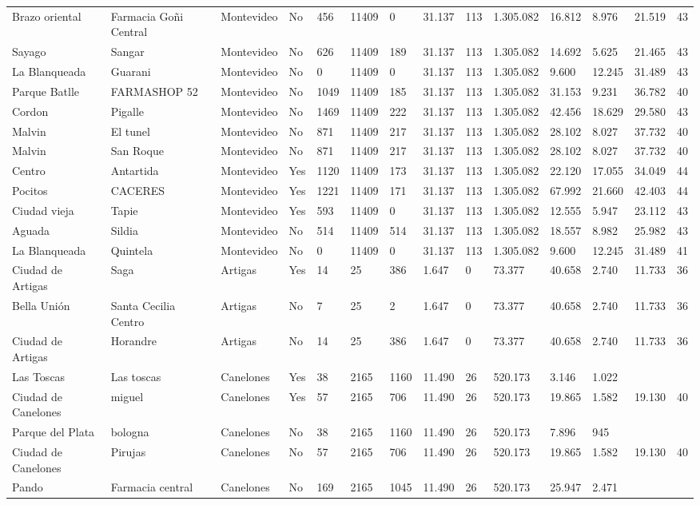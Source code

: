 \documentclass[11pt]{article}
\begin{document}
\begin{landscape}
\begin{longtable}[htbp]{@{}p{1.2cm}p{1cm}p{1.5cm}p{1cm}p{1cm}p{1cm}p{1cm}p{1cm}p{1cm}p{1cm}p{1cm}p{1.2cm}p{1cm}p{1cm}@{}}
Brazo oriental	&	Farmacia Goñi Central	&	Montevideo	&	No	&	456	&	11409	&	0	&	31.137	&	113	&	1.305.082	&	16.812	&	8.976	&	21.519	&	43	\tabularnewline
Sayago	&	Sangar	&	Montevideo	&	No	&	626	&	11409	&	189	&	31.137	&	113	&	1.305.082	&	14.692	&	5.625	&	21.465	&	43	\tabularnewline
La Blanqueada	&	Guarani	&	Montevideo	&	No	&	0	&	11409	&	0	&	31.137	&	113	&	1.305.082	&	9.600	&	12.245	&	31.489	&	43	\tabularnewline
Parque Batlle	&	FARMASHOP 52	&	Montevideo	&	No	&	1049	&	11409	&	185	&	31.137	&	113	&	1.305.082	&	31.153	&	9.231	&	36.782	&	40	\tabularnewline
Cordon	&	Pigalle	&	Montevideo	&	No	&	1469	&	11409	&	222	&	31.137	&	113	&	1.305.082	&	42.456	&	18.629	&	29.580	&	43	\tabularnewline
Malvin	&	El tunel	&	Montevideo	&	No	&	871	&	11409	&	217	&	31.137	&	113	&	1.305.082	&	28.102	&	8.027	&	37.732	&	40	\tabularnewline
Malvin	&	San Roque	&	Montevideo	&	No	&	871	&	11409	&	217	&	31.137	&	113	&	1.305.082	&	28.102	&	8.027	&	37.732	&	40	\tabularnewline
Centro	&	Antartida	&	Montevideo	&	Yes	&	1120	&	11409	&	173	&	31.137	&	113	&	1.305.082	&	22.120	&	17.055	&	34.049	&	44	\tabularnewline
Pocitos	&	CACERES	&	Montevideo	&	Yes	&	1221	&	11409	&	171	&	31.137	&	113	&	1.305.082	&	67.992	&	21.660	&	42.403	&	44	\tabularnewline
Ciudad vieja	&	Tapie	&	Montevideo	&	Yes	&	593	&	11409	&	0	&	31.137	&	113	&	1.305.082	&	12.555	&	5.947	&	23.112	&	43	\tabularnewline
Aguada	&	Sildia	&	Montevideo	&	No	&	514	&	11409	&	514	&	31.137	&	113	&	1.305.082	&	18.557	&	8.982	&	25.982	&	43	\tabularnewline
La Blanqueada	&	Quintela	&	Montevideo	&	No	&	0	&	11409	&	0	&	31.137	&	113	&	1.305.082	&	9.600	&	12.245	&	31.489	&	41	\tabularnewline
Ciudad de Artigas	&	Saga	&	Artigas	&	Yes	&	14	&	25	&	386	&	1.647	&	0	&	73.377	&	40.658	&	2.740	&	11.733	&	36	\tabularnewline
Bella Unión	&	Santa Cecilia Centro	&	Artigas	&	No	&	7	&	25	&	2	&	1.647	&	0	&	73.377	&	40.658	&	2.740	&	11.733	&	36	\tabularnewline
Ciudad de Artigas	&	Horandre	&	Artigas	&	No	&	14	&	25	&	386	&	1.647	&	0	&	73.377	&	40.658	&	2.740	&	11.733	&	36	\tabularnewline
Las Toscas	&	Las toscas	&	Canelones	&	Yes	&	38	&	2165	&	1160	&	11.490	&	26	&	520.173	&	3.146	&	1.022	&		&		\tabularnewline
Ciudad de Canelones	&	miguel	&	Canelones	&	Yes	&	57	&	2165	&	706	&	11.490	&	26	&	520.173	&	19.865	&	1.582	&	19.130	&	40	\tabularnewline
Parque del Plata	&	bologna	&	Canelones	&	No	&	38	&	2165	&	1160	&	11.490	&	26	&	520.173	&	7.896	&	945	&		&		\tabularnewline
Ciudad de Canelones	&	Pirujas	&	Canelones	&	No	&	57	&	2165	&	706	&	11.490	&	26	&	520.173	&	19.865	&	1.582	&	19.130	&	40	\tabularnewline
Pando	&	Farmacia central	&	Canelones	&	No	&	169	&	2165	&	1045	&	11.490	&	26	&	520.173	&	25.947	&	2.471	&		&		\tabularnewline

\end{longtable}
\end{landscape}
\end{document}
